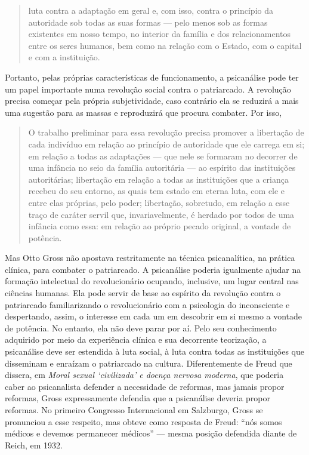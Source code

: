 \begin{quote}
luta contra a adaptação em geral e, com
isso, contra o princípio da autoridade sob todas as suas formas --- pelo
menos sob as formas existentes em nosso tempo, no interior da família e
dos relacionamentos entre os seres humanos, bem como na relação com o
Estado, com o capital e com a instituição.
\end{quote}

Portanto, pelas próprias características de funcionamento, a psicanálise
pode ter um papel importante numa revolução social contra o patriarcado.
A revolução precisa começar pela própria subjetividade, caso contrário
ela se reduzirá a mais uma sugestão para as massas e reproduzirá que
procura combater. Por isso,

\begin{quote}
O trabalho preliminar para essa revolução precisa promover a
libertação de cada indivíduo em relação ao princípio de autoridade que
ele carrega em si; em relação a todas as adaptações --- que nele se
formaram no decorrer de uma infância no seio da família autoritária ---
ao espírito das instituições autoritárias; libertação em relação a todas
as instituições que a criança recebeu do seu entorno, as quais tem
estado em eterna luta, com ele e entre elas próprias, pelo
poder; libertação, sobretudo, em relação a esse traço de caráter
servil que, invariavelmente, é herdado por todos de uma infância como
essa: em relação ao próprio pecado original, a vontade de
potência.
\end{quote}

Mas Otto Gross não apostava restritamente na técnica psicanalítica, na
prática clínica, para combater o patriarcado. A psicanálise poderia
igualmente ajudar na formação intelectual do revolucionário ocupando,
inclusive, um lugar central nas ciências humanas. Ela pode servir de
base ao espírito da revolução contra o patriarcado familiarizando o
revolucionário com a psicologia do inconsciente e despertando, assim, o
interesse em cada um em descobrir em si mesmo a vontade de potência. No
entanto, ela não deve parar por aí. Pelo seu conhecimento adquirido por
meio da experiência clínica e sua decorrente teorização, a psicanálise
deve ser estendida à luta social, à luta contra todas as instituições
que disseminam e enraízam o patriarcado na cultura. Diferentemente de
Freud que dissera, em \emph{Moral sexual `civilizada' e doença nervosa
moderna}, que poderia caber ao psicanalista defender a necessidade de
reformas, mas jamais propor reformas, Gross expressamente defendia que a
psicanálise deveria propor reformas. No primeiro Congresso Internacional
em Salzburgo, Gross se pronunciou a esse respeito, mas obteve como
resposta de Freud: ``nós somos médicos e devemos permanecer médicos'' ---
mesma posição defendida diante de Reich, em 1932.

